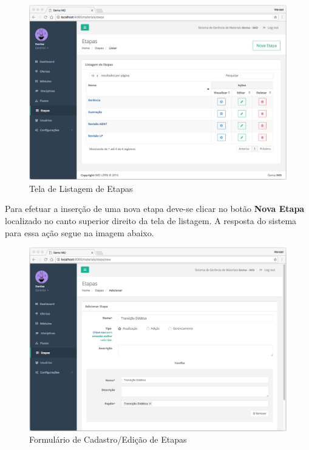 \begin{figure}[H]
\centering
     \includegraphics[width=1.0\textwidth]{Screens/StepsList.png}
      \caption{Tela de Listagem de Etapas}
       \label{fig:scStepsList}
\end{figure}

Para efetuar a inserção de uma nova etapa deve-se clicar no botão \textbf{Nova Etapa} localizado no canto superior direito da tela de listagem. A resposta do sistema para essa ação segue na imagem abaixo.

\begin{figure}[H]
\centering
     \includegraphics[width=1.0\textwidth]{Screens/StepsForm.png}
      \caption{Formulário de Cadastro/Edição de Etapas}
       \label{fig:csStepsForm}
\end{figure}

